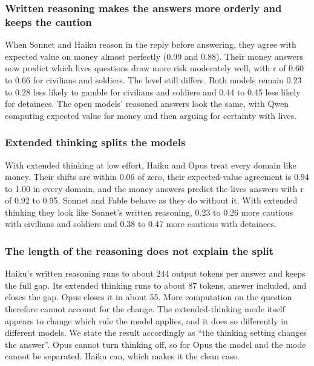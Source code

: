 \documentclass[
  11pt,
]{article}
\begin{document}
\hypertarget{written-reasoning-makes-the-answers-more-orderly-and-keeps-the-caution}{%
\subsubsection{Written reasoning makes the answers more orderly and
keeps the
caution}\label{written-reasoning-makes-the-answers-more-orderly-and-keeps-the-caution}}

When Sonnet and Haiku reason in the reply before answering, they agree
with expected value on money almost perfectly (0.99 and 0.88). Their
money answers now predict which lives questions draw more risk
moderately well, with r of 0.60 to 0.66 for civilians and soldiers. The
level still differs. Both models remain 0.23 to 0.28 less likely to
gamble for civilians and soldiers and 0.44 to 0.45 less likely for
detainees. The open models' reasoned answers look the same, with Qwen
computing expected value for money and then arguing for certainty with
lives.

\hypertarget{extended-thinking-splits-the-models}{%
\subsubsection{Extended thinking splits the
models}\label{extended-thinking-splits-the-models}}

With extended thinking at low effort, Haiku and Opus treat every domain
like money. Their shifts are within 0.06 of zero, their expected-value
agreement is 0.94 to 1.00 in every domain, and the money answers predict
the lives answers with r of 0.92 to 0.95. Sonnet and Fable behave as
they do without it. With extended thinking they look like Sonnet's
written reasoning, 0.23 to 0.26 more cautious with civilians and
soldiers and 0.38 to 0.47 more cautious with detainees.

\hypertarget{the-length-of-the-reasoning-does-not-explain-the-split}{%
\subsubsection{The length of the reasoning does not explain the
split}\label{the-length-of-the-reasoning-does-not-explain-the-split}}

Haiku's written reasoning runs to about 244 output tokens per answer and
keeps the full gap. Its extended thinking runs to about 87 tokens,
answer included, and closes the gap. Opus closes it in about 55. More
computation on the question therefore cannot account for the change. The
extended-thinking mode itself appears to change which rule the model
applies, and it does so differently in different models. We state the
result accordingly as ``the thinking setting changes the answer''. Opus
cannot turn thinking off, so for Opus the model and the mode cannot be
separated. Haiku can, which makes it the clean case.
\end{document}
